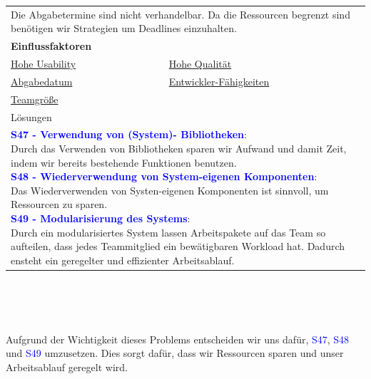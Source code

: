 \documentclass[enabledeprecatedfontcommands,fontsize=11pt,paper=a4,twoside]{scrartcl}
\newcounter{one}
\newcommand{\cb}[1]{{\textcolor{blue}{#1}}}
\begin{document}
\newpage
\hspace{-0.65cm}
\begin{tabular} {|p{8cm} p{8cm}|}
	\hline
	\rowcolor{prob}\multicolumn{2}{|l|}{\parbox{16cm}{\textbf{19: Einhaltung der Abgabetermine}}} \\  \hline\hline 
	\multicolumn{2}{|l|}{\parbox{16cm}{Die Abgabetermine sind nicht verhandelbar. Da die Ressourcen begrenzt sind benötigen wir Strategien um Deadlines einzuhalten.}}\rule{0pt}{1ex}\\ [1ex] \hline
	\multicolumn{2}{|l|}{\textbf{Einflussfaktoren}}\\
	\hyperlink {g}{Hohe Usability}&
	\hyperlink {h}{Hohe Qualität}\\
	\hyperlink {uu}{Abgabedatum} &
	\hyperlink {vv}{Entwickler-Fähigkeiten} \\
	\hyperlink {xx}{Teamgröße} &
	\\ \hline
	\multicolumn{2}{|l|}{Lösungen} \\
	\multicolumn{2}{|l|}{\parbox{16cm}{
			\textbf{\cb{\hypertarget{qqq}{S47 - Verwendung von (System)- Bibliotheken}}}: \\
			Durch das Verwenden von Bibliotheken sparen wir Aufwand und damit Zeit, indem wir bereits bestehende Funktionen benutzen. \\
			\textbf{\cb{S48 - Wiederverwendung von System-eigenen Komponenten}}: \\
			Das Wiederverwenden von Systen-eigenen Komponenten ist sinnvoll, um Ressourcen zu sparen. \\
			\textbf{\cb{S49 - Modularisierung des Systems}}: \\
			Durch ein modularisiertes System lassen Arbeitspakete auf das Team so aufteilen, dass jedes Teammitglied ein bewätigbaren Workload hat. Dadurch ensteht ein geregelter und effizienter Arbeitsablauf.
	} }\\ [6ex] \hline
\end{tabular}\\ \\ \\
\begin{onehalfspace}
	Aufgrund der Wichtigkeit dieses Problems entscheiden wir uns dafür, \cb{S47}, \cb{S48} und \cb{S49} umzusetzen. Dies sorgt dafür, dass wir Ressourcen sparen und unser Arbeitsablauf geregelt wird.
\end{onehalfspace}
\end{document}
